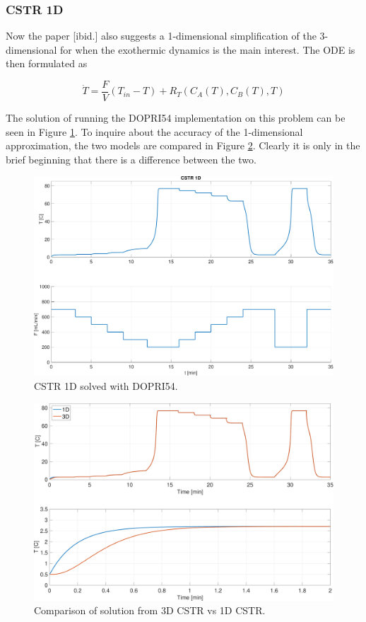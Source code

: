 \subsubsection*{CSTR 1D}
Now the paper [ibid.] also suggests a 1-dimensional simplification of the 3-dimensional for when the exothermic dynamics is the main interest. The ODE is then formulated as

\begin{equation}
\dot{T}=\frac{F}{V}\left(T_{i n}-T\right)+R_{T}\left(C_{A}(T), C_{B}(T), T\right)
\end{equation}

The solution of running the DOPRI54 implementation on this problem can be seen in Figure \ref{fig:6_5_1d}. To inquire about the accuracy of the 1-dimensional approximation, the two models are compared in Figure \ref{fig:6_5_both}. Clearly it is only in the brief beginning that there is a difference between the two.
\begin{figure}[h]
    \centering
    \includegraphics[width=\textwidth]{plots/6_5_1D.pdf}
    \caption{CSTR 1D solved with DOPRI54.}
    \label{fig:6_5_1d}
\end{figure}

\begin{figure}[h]
    \centering
    \includegraphics[width=\textwidth]{plots/6_5_both.pdf}
    \caption{Comparison of solution from 3D CSTR vs 1D CSTR.}
    \label{fig:6_5_both}
\end{figure}


